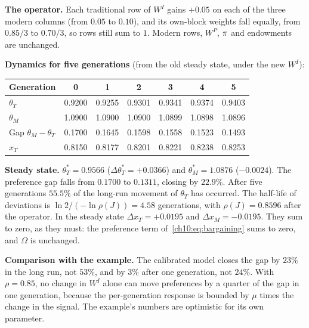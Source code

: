 \documentclass[../solutions_manual.tex]{subfiles}
\begin{document}
\textbf{The operator.} Each traditional row of $W^I$ gains $+0.05$ on each of the three modern columns (from $0.05$ to $0.10$), and its own-block weights fall equally, from $0.85/3$ to $0.70/3$, so rows still sum to $1$. Modern rows, $W^P$, $\pi$ and endowments are unchanged.

 \textbf{Dynamics for five generations} (from the old steady state, under the new $W^I$):
\begin{center}
\begin{tabular}{lcccccc}
\toprule
Generation & 0 & 1 & 2 & 3 & 4 & 5 \\
\midrule
$\theta_T$ & 0.9200 & 0.9255 & 0.9301 & 0.9341 & 0.9374 & 0.9403 \\
$\theta_M$ & 1.0900 & 1.0900 & 1.0900 & 1.0899 & 1.0898 & 1.0896 \\
Gap $\theta_M - \theta_T$ & 0.1700 & 0.1645 & 0.1598 & 0.1558 & 0.1523 & 0.1493 \\
$x_T$ & 0.8150 & 0.8177 & 0.8201 & 0.8221 & 0.8238 & 0.8253 \\
\bottomrule
\end{tabular}
\end{center}

\textbf{Steady state.} $\theta^*_T = 0.9566$ ($\Delta\theta^*_T = +0.0366$) and $\theta^*_M = 1.0876$ ($-0.0024$). The preference gap falls from $0.1700$ to $0.1311$, closing by $22.9\%$. After five generations $55.5\%$ of the long-run movement of $\theta_T$ has occurred. The half-life of deviations is $\ln 2/(-\ln\rho(J)) = 4.58$ generations, with $\rho(J) = 0.8596$ after the operator. In the steady state $\Delta x_T = +0.0195$ and $\Delta x_M = -0.0195$. They sum to zero, as they must: the preference term of~\eqref{ch10:eq:bargaining} sums to zero, and $\Omega$ is unchanged.

\textbf{Comparison with the example.} The calibrated model closes the gap by $23\%$ in the long run, not $53\%$, and by $3\%$ after one generation, not $24\%$. With $\rho = 0.85$, no change in $W^I$ alone can move preferences by a quarter of the gap in one generation, because the per-generation response is bounded by $\mu$ times the change in the signal. The example's numbers are optimistic for its own parameter.
\end{document}
